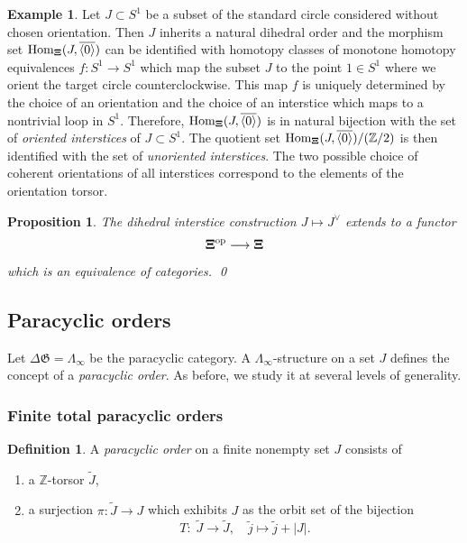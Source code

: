 \documentclass[english,11pt,leqno]{article}
\def\ZZ{\mathbb{Z}}
\def\Gen{\mathfrak{G}}
\def\Hom{\operatorname{Hom}}
\def\lra{\longrightarrow}
\def\op{{\operatorname{op}}}
\def\Hom{\operatorname{Hom}}
\newtheorem{prop}[thm]{Proposition}
\theoremstyle{definition}
\newtheorem{defi}[thm]{Definition}
\newtheorem{exa}[thm]{Example}
\theoremstyle{remark}
\numberwithin{equation}{section}
\begin{document}
\begin{exa} Let $J \subset S^1$ be a subset of the standard circle considered without chosen
	orientation. Then $J$ inherits a natural dihedral order and the morphism set
	$\Hom_{\bf \Xi}(J, \overline {\langle 0\rangle})$ can be identified with homotopy classes of monotone homotopy
	equivalences $f:S^1 \to S^1$ which map the subset $J$ to the point $1 \in S^1$ where we
	orient the target circle counterclockwise. This map $f$ is uniquely determined by the choice
	of an orientation and the choice of an interstice which maps to a nontrivial loop in $S^1$.
	Therefore,  $\Hom_{\bf \Xi}(J, \overline {\langle 0\rangle})$ is in natural bijection with the set of {\em
	oriented interstices} of $J \subset S^1$. The quotient set $\Hom_{\bf \Xi}(J, \overline {\langle 0\rangle})/(\ZZ/2)$ is
	then identified with the set of {\em unoriented interstices}. The two possible choice of
	coherent orientations of all interstices correspond to the elements of the orientation torsor.
\end{exa}

\begin{prop}\label{prop:dihedral-interstice} The dihedral interstice construction $J \mapsto J^{\vee}$ extends to a functor
	\[
		{\bf \Xi}^{\op} \lra {\bf \Xi}
	\]
	which is an equivalence of categories. \qed
\end{prop}






\subsection{Paracyclic   orders}\label{sec:paraorder}

Let $\Delta \Gen = \Lambda_{\infty}$ be the paracyclic category. A $\Lambda_{\infty}$-structure on a
set $J$ defines the concept of a {\em paracyclic order}. As before, we study it at several
levels of generality. 

\subsubsection{Finite total paracyclic orders}

\begin{defi} 
	A {\em paracyclic order} on a finite nonempty set $J$ consists of 
	\begin{enumerate}
		\item a $\ZZ$-torsor $\widetilde{J}$,
		\item a surjection $\pi: \widetilde{J} \to J$ which exhibits $J$ as the orbit set of
			the bijection \[T:\; \widetilde{J} \to \widetilde{J},\quad \widetilde{j} \mapsto \widetilde{j} +
				|J|.\]
	\end{enumerate}
\end{defi}
\end{document}

